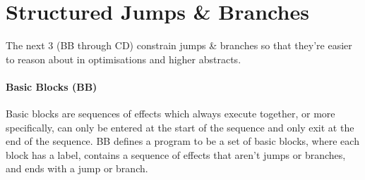 \documentclass[main.tex]{subfiles}
\begin{document}
\section{Structured Jumps \& Branches}
The next 3 \ils{} (BB through CD) constrain jumps \& branches so that they're easier to reason about in optimisations and higher abstracts.

\paragraph{Basic Blocks (BB)} Basic blocks are sequences of effects which always execute together, or more specifically, can only be entered at the start of the sequence and only exit at the end of the sequence. BB defines a program to be a set of basic blocks, where each block has a label, contains a sequence of effects that aren't jumps or branches, and ends with a jump or branch.

\biblio{}
\onlyinsubfile{\glsaddall\printglossaries}
\end{document}

